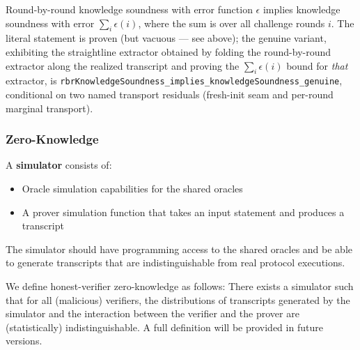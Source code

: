 \begin{theorem}
    \label{thm:rbr_knowledge_soundness_implies_knowledge_soundness}
    Round-by-round knowledge soundness with error function $\epsilon$ implies knowledge soundness
    with error $\sum_i \epsilon(i)$, where the sum is over all challenge rounds $i$.  The literal
    statement is proven (but vacuous --- see above); the genuine variant, exhibiting the
    straightline extractor obtained by folding the round-by-round extractor along the realized
    transcript and proving the $\sum_i \epsilon(i)$ bound for \emph{that} extractor, is
    \texttt{rbrKnowledgeSoundness\_implies\_knowledgeSoundness\_genuine}, conditional on two named
    transport residuals (fresh-init seam and per-round marginal transport).
\end{theorem}

\subsubsection{Zero-Knowledge}

\begin{definition}[Simulator]
    \label{def:simulator}
    A \textbf{simulator} consists of:
    \begin{itemize}
        \item Oracle simulation capabilities for the shared oracles
        \item A prover simulation function that takes an input statement and produces a transcript
    \end{itemize}
    The simulator should have programming access to the shared oracles and be able to generate
    transcripts that are indistinguishable from real protocol executions.
\end{definition}

\begin{remark}
    We define honest-verifier zero-knowledge as follows: There exists a simulator such that for all
    (malicious) verifiers, the distributions of transcripts generated by the simulator and the
    interaction between the verifier and the prover are (statistically) indistinguishable.
    A full definition will be provided in future versions.
\end{remark}

